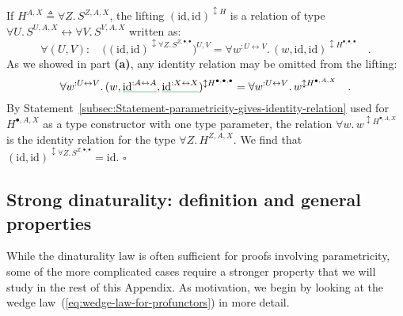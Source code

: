If $H^{A,X}\triangleq\forall Z.\,S^{Z,A,X}$, the lifting $(\text{id},\text{id})^{\updownarrow H}$
is a relation of type $\forall U.\,S^{U,A,X}\leftrightarrow\forall V.\,S^{V,A,X}$
written as:
\[
\forall(U,V):\quad\big((\text{id},\text{id})^{\updownarrow\forall Z.\,S^{Z,\bullet,\bullet}}\big)^{U,V}=\forall w^{:U\leftrightarrow V}.\,(w,\text{id},\text{id})^{\updownarrow H^{\bullet,\bullet,\bullet}}\quad.
\]
As we showed in part \textbf{(a)}, any identity relation may be omitted
from the lifting:
\[
\forall w^{:U\leftrightarrow V}.\,(w,\gunderline{\text{id}^{:A\leftrightarrow A}},\gunderline{\text{id}^{:X\leftrightarrow X}})^{\updownarrow H^{\bullet,\bullet,\bullet}}=\forall w^{:U\leftrightarrow V}.\,w^{\updownarrow H^{\bullet,A,X}}\quad.
\]
By Statement~\ref{subsec:Statement-parametricity-gives-identity-relation}
used for $H^{\bullet,A,X}$ as a type constructor with one type parameter,
the relation $\forall w.\,w^{\updownarrow H^{\bullet,A,X}}$ is the
identity relation for the type $\forall Z.\,H^{Z,A,X}$. We find that
$(\text{id},\text{id})^{\updownarrow\forall Z.\,S^{Z,\bullet,\bullet}}=\text{id}$.
$\square$

\begin{comment}
commutativity law does not hold!
\end{comment}


\subsection{Strong dinaturality: definition and general properties\label{subsec:Strong-dinaturality.-General-properties}}

While the dinaturality law is often sufficient for proofs involving
parametricity, some of the more complicated cases require a stronger
property that we will study in the rest of this Appendix. As motivation,
we begin by looking at the wedge law~(\ref{eq:wedge-law-for-profunctors})
in more detail.

